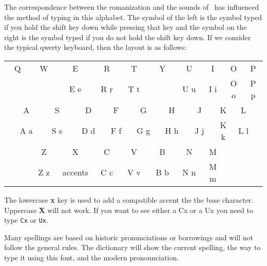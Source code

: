 The correspondence between the romanization and the sounds of \LanguageName\ has influenced the method of typing in this alphabet.
The symbol of the left is the symbol typed if you hold the shift key down while pressing that key and the symbol on the right is the symbol typed if you do not hold the shift key down.
If we consider the typical qwerty keyboard, then the layout is as follows:

\begin{center}
\scriptsize
\begin{tabular}{cccccccccccccccccccc}
\hline
\multicolumn{2}{|c}{\rule{0pt}{4mm}\Large Q}&
\multicolumn{2}{|c}{\Large W}&
\multicolumn{2}{|c}{\Large E}&
\multicolumn{2}{|c}{\Large R}&
\multicolumn{2}{|c}{\Large T}&
\multicolumn{2}{|c}{\Large Y}&
\multicolumn{2}{|c}{\Large U}&
\multicolumn{2}{|c}{\Large I}&
\multicolumn{2}{|c}{\Large O}&
\multicolumn{2}{|c|}{\Large P}\\
\multicolumn{2}{|c}{}&
\multicolumn{2}{|c}{}&
\multicolumn{2}{|c}{\confont E e}&
\multicolumn{2}{|c}{\confont R r}&
\multicolumn{2}{|c}{\confont T t}&
\multicolumn{2}{|c}{}&
\multicolumn{2}{|c}{\confont U u}&
\multicolumn{2}{|c}{\confont I i}&
\multicolumn{2}{|c}{\confont O o}&
\multicolumn{2}{|c|}{\confont P p}\\\hline
&
\multicolumn{2}{|c}{\rule{0pt}{4mm}\Large A}&
\multicolumn{2}{|c}{\Large S}&
\multicolumn{2}{|c}{\Large D}&
\multicolumn{2}{|c}{\Large F}&
\multicolumn{2}{|c}{\Large G}&
\multicolumn{2}{|c}{\Large H}&
\multicolumn{2}{|c}{\Large J}&
\multicolumn{2}{|c}{\Large K}&
\multicolumn{2}{|c|}{\Large L}\\&
\multicolumn{2}{|c}{\confont A a}&
\multicolumn{2}{|c}{\confont S s}&
\multicolumn{2}{|c}{\confont D d}&
\multicolumn{2}{|c}{\confont F f}&
\multicolumn{2}{|c}{\confont G g}&
\multicolumn{2}{|c}{\confont H h}&
\multicolumn{2}{|c}{\confont J j}&
\multicolumn{2}{|c}{\confont K k}&
\multicolumn{2}{|c|}{\confont L l}\\\cline{2-19}
&&
\multicolumn{2}{|c}{\rule{0pt}{4mm}\Large Z}&
\multicolumn{2}{|c}{\Large X}&
\multicolumn{2}{|c}{\Large C}&
\multicolumn{2}{|c}{\Large V}&
\multicolumn{2}{|c}{\Large B}&
\multicolumn{2}{|c}{\Large N}&
\multicolumn{2}{|c|}{\Large M}\\&&
\multicolumn{2}{|c}{\confont Z z}&
\multicolumn{2}{|c}{accents}&
\multicolumn{2}{|c}{\confont C c}&
\multicolumn{2}{|c}{\confont V v}&
\multicolumn{2}{|c}{\confont B b}&
\multicolumn{2}{|c}{\confont N n}&
\multicolumn{2}{|c|}{\confont M m}\\\cline{3-16}
\end{tabular}
\end{center}

The lowercase \textbf{x} key is used to add a compatible accent the the base character.
Uppercase \textbf{X} will not work.
If you want to see either a {\confont Cx} or a {\confont Ux} you need to type \texttt{Cx} or \texttt{Ux}.

Many spellings are based on historic pronunciations or borrowings and will not follow the general rules.
The dictionary will show the current spelling, the way to type it using this font, and the modern pronounciation.

